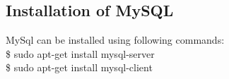 \subsection{Installation of MySQL}
MySql can be installed using following commands:\\

\hspace{4pt} \$ sudo apt-get install mysql-server\\

\hspace{4pt} \$ sudo apt-get install mysql-client

